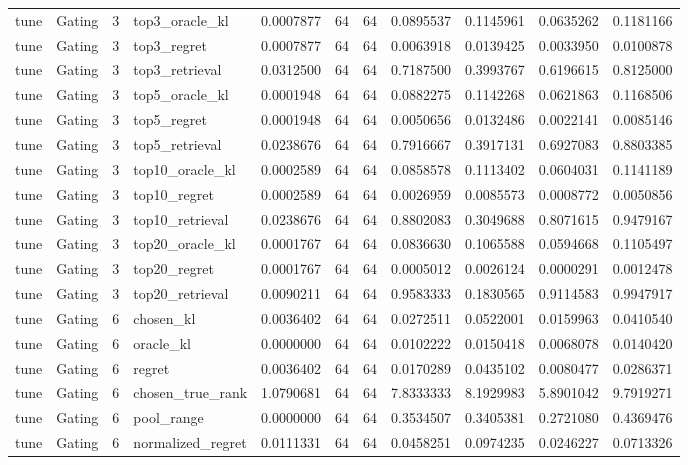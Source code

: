 \begin{tabular}{llrlrrrrrrr}
tune & Gating & 3 & top3_oracle_kl & 0.0007877 & 64 & 64 & 0.0895537 & 0.1145961 & 0.0635262 & 0.1181166 \\
tune & Gating & 3 & top3_regret & 0.0007877 & 64 & 64 & 0.0063918 & 0.0139425 & 0.0033950 & 0.0100878 \\
tune & Gating & 3 & top3_retrieval & 0.0312500 & 64 & 64 & 0.7187500 & 0.3993767 & 0.6196615 & 0.8125000 \\
tune & Gating & 3 & top5_oracle_kl & 0.0001948 & 64 & 64 & 0.0882275 & 0.1142268 & 0.0621863 & 0.1168506 \\
tune & Gating & 3 & top5_regret & 0.0001948 & 64 & 64 & 0.0050656 & 0.0132486 & 0.0022141 & 0.0085146 \\
tune & Gating & 3 & top5_retrieval & 0.0238676 & 64 & 64 & 0.7916667 & 0.3917131 & 0.6927083 & 0.8803385 \\
tune & Gating & 3 & top10_oracle_kl & 0.0002589 & 64 & 64 & 0.0858578 & 0.1113402 & 0.0604031 & 0.1141189 \\
tune & Gating & 3 & top10_regret & 0.0002589 & 64 & 64 & 0.0026959 & 0.0085573 & 0.0008772 & 0.0050856 \\
tune & Gating & 3 & top10_retrieval & 0.0238676 & 64 & 64 & 0.8802083 & 0.3049688 & 0.8071615 & 0.9479167 \\
tune & Gating & 3 & top20_oracle_kl & 0.0001767 & 64 & 64 & 0.0836630 & 0.1065588 & 0.0594668 & 0.1105497 \\
tune & Gating & 3 & top20_regret & 0.0001767 & 64 & 64 & 0.0005012 & 0.0026124 & 0.0000291 & 0.0012478 \\
tune & Gating & 3 & top20_retrieval & 0.0090211 & 64 & 64 & 0.9583333 & 0.1830565 & 0.9114583 & 0.9947917 \\
tune & Gating & 6 & chosen_kl & 0.0036402 & 64 & 64 & 0.0272511 & 0.0522001 & 0.0159963 & 0.0410540 \\
tune & Gating & 6 & oracle_kl & 0.0000000 & 64 & 64 & 0.0102222 & 0.0150418 & 0.0068078 & 0.0140420 \\
tune & Gating & 6 & regret & 0.0036402 & 64 & 64 & 0.0170289 & 0.0435102 & 0.0080477 & 0.0286371 \\
tune & Gating & 6 & chosen_true_rank & 1.0790681 & 64 & 64 & 7.8333333 & 8.1929983 & 5.8901042 & 9.7919271 \\
tune & Gating & 6 & pool_range & 0.0000000 & 64 & 64 & 0.3534507 & 0.3405381 & 0.2721080 & 0.4369476 \\
tune & Gating & 6 & normalized_regret & 0.0111331 & 64 & 64 & 0.0458251 & 0.0974235 & 0.0246227 & 0.0713326 \\

\end{tabular}

